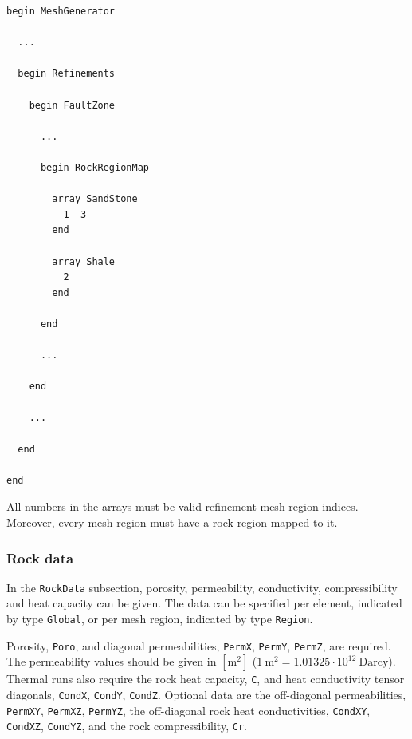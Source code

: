 \begin{verbatim}
begin MeshGenerator

  ... 

  begin Refinements 

    begin FaultZone

      ... 

      begin RockRegionMap
    
        array SandStone
          1  3
        end
    
        array Shale
          2
        end
    
      end
    
      ... 
    
    end 

    ... 

  end

end
\end{verbatim}
%
All numbers in the arrays must be valid refinement mesh region
indices. Moreover, every mesh region must have a rock region mapped to
it. 

\subsubsection{Rock data}
\label{sec:lgr-struct-rockdata}

In the \texttt{RockData} subsection, porosity, permeability,
conductivity, compressibility and heat capacity can be given. The data
can be specified per element, indicated by type \texttt{Global}, or
per mesh region, indicated by type \texttt{Region}. 

Porosity, \texttt{Poro}, and diagonal permeabilities, \texttt{PermX},
\texttt{PermY}, \texttt{PermZ}, are required. The permeability values
should be given in $[\text{m}^2]$ ($1\: \text{m}^2 = 1.01325\cdot
10^{12}\:\text{Darcy}$). Thermal runs also require the rock heat
capacity, \texttt{C}, and heat conductivity tensor diagonals,
\texttt{CondX}, \texttt{CondY}, \texttt{CondZ}. Optional data are the
off-diagonal permeabilities, \texttt{PermXY}, \texttt{PermXZ},
\texttt{PermYZ}, the off-diagonal rock heat conductivities,
\texttt{CondXY}, \texttt{CondXZ}, \texttt{CondYZ}, and the rock
compressibility, \texttt{Cr}. 


